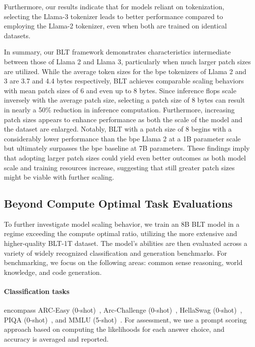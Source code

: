 Furthermore, our results indicate that for models reliant on tokenization, selecting the Llama-3 tokenizer leads to better performance compared to employing the Llama-2 tokenizer, even when both are trained on identical datasets.

In summary, our {\textsc BLT} framework demonstrates characteristics intermediate between those of Llama 2 and Llama 3, particularly when much larger patch sizes are utilized. While the average token sizes for the bpe tokenizers of Llama 2 and 3 are 3.7 and 4.4 bytes respectively, {\textsc BLT} achieves comparable scaling behaviors with mean patch sizes of 6 and even up to 8 bytes. Since inference flops scale inversely with the average patch size, selecting a patch size of 8 bytes can result in nearly a 50\% reduction in inference computation. Furthermore, increasing patch sizes appears to enhance performance as both the scale of the model and the dataset are enlarged. Notably, {\textsc BLT} with a patch size of 8 begins with a considerably lower performance than the bpe Llama 2 at a 1B parameter scale but ultimately surpasses the bpe baseline at 7B parameters. These findings imply that adopting larger patch sizes could yield even better outcomes as both model scale and training resources increase, suggesting that still greater patch sizes might be viable with further scaling.

\subsection{Beyond Compute Optimal Task Evaluations}
\label{section:evals}
To further investigate model scaling behavior, we train an 8B {\textsc BLT} model in a regime exceeding the compute optimal ratio, utilizing the more extensive and higher-quality {\textsc BLT}-1T dataset. The model’s abilities are then evaluated across a variety of widely recognized classification and generation benchmarks. For benchmarking, we focus on the following areas: common sense reasoning, world knowledge, and code generation.
\paragraph{Classification tasks} encompass ARC-Easy (0-shot)~\citep{Eval_ARC}, Arc-Challenge (0-shot)~\citep{Eval_ARC}, HellaSwag (0-shot)~\citep{Eval_hellaswag}, PIQA (0-shot)~\citep{Eval_piqa}, and MMLU (5-shot)~\citep{hendrycks2020measuring}. For assessment, we use a prompt scoring approach based on computing the likelihoods for each answer choice, and accuracy is averaged and reported.
